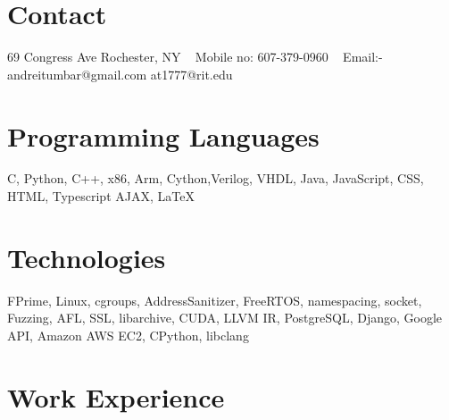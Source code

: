 \documentclass[print]{cv-style}          %
\begin{document}


\begin{aside}
%
\section{Contact}
69 Congress Ave 
Rochester, NY
~
Mobile no:
607-379-0960
~
Email:-
andreitumbar@gmail.com
at1777@rit.edu
%
%
\section{Programming
   Languages}
C, Python, C++,
x86, Arm,
Cython,Verilog,
VHDL, Java, JavaScript,
CSS, HTML, Typescript
AJAX, \LaTeX{}
%
%
\section{Technologies}
FPrime, Linux, cgroups,
AddressSanitizer,
FreeRTOS,
namespacing, socket,
Fuzzing, AFL,
SSL, libarchive,
CUDA, LLVM IR,
PostgreSQL, Django,
Google API,
Amazon AWS EC2,
CPython, libclang
%
\end{aside}



\section{Work Experience}
\end{document}
